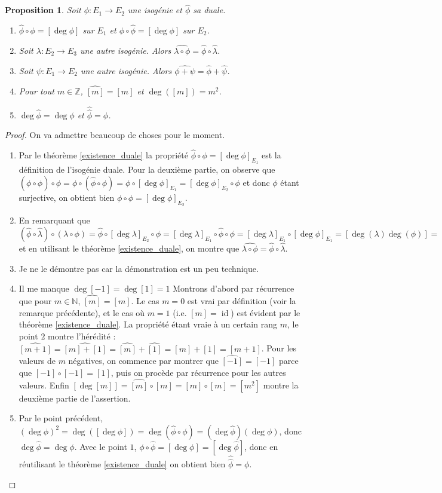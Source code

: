 \documentclass{article}
\theoremstyle{plain}%
\newtheorem{prop}[thm]{Proposition}
\theoremstyle{definition}%
\newcommand{\Z}{\mathbb{Z}}
\newcommand{\N}{\mathbb{N}}
\newcommand{\h}{\widehat}
\DeclareMathOperator{\id}{id}
\begin{document}
\begin{prop}
  Soit $\phi : E_1 \to E_2$ une isogénie et $\h\phi$ sa duale.  
  \begin{enumerate}
    \item $\h\phi\circ\phi = [\deg{\phi}]$ sur $E_1$ et $\phi\circ\h\phi = [\deg{\phi}]$ sur $E_2$.
    \item Soit $\lambda :E_2\to E_3$ une autre isogénie. Alors $\h{\lambda\circ\phi} = \h\phi\circ\h\lambda$.
    \item Soit $\psi :E_1\to E_2$ une autre isogénie. Alors $\h{\phi+\psi} = \h\phi + \h\psi$.
    \item Pour tout $m\in\Z$, $\h{[m]} = [m]$ et $\deg([m]) = m^2$.
    \item $\deg\h\phi = \deg\phi$ et $\h{\h\phi} = \phi$.
  \end{enumerate}
\end{prop}

\begin{proof}
  On va admettre beaucoup de choses pour le moment.
  \begin{enumerate}
    \item Par le théorème \ref{existence_duale} la propriété $\h\phi\circ\phi = [\deg{\phi}]_{E_1}$ est la définition de l'isogénie duale. Pour la deuxième partie, on observe que $(\phi\circ\h\phi)\circ\phi = \phi\circ(\h\phi\circ\phi) = \phi\circ[\deg{\phi}]_{E_1} = [\deg{\phi}]_{E_2}\circ\phi$ et donc $\phi$ étant surjective, on obtient bien $\phi\circ\h\phi = [\deg{\phi}]_{E_2}$.
    \item En remarquant que $(\h\phi\circ\h\lambda)\circ(\lambda\circ\phi) = \h\phi\circ [\deg\lambda]_{E_2} \circ\phi = [\deg\lambda]_{E_1}\circ\h\phi\circ\phi = [\deg\lambda]_{E_1}\circ [\deg\phi]_{E_1} = [\deg(\lambda)\deg(\phi)] = [\deg(\lambda\circ\phi)]$ et en utilisant le théorème \ref{existence_duale}, on montre que $\h{\lambda\circ\phi} = \h\phi\circ\h\lambda$.
    \item Je ne le démontre pas car la démonstration est un peu technique.
    \item {\color{blue} Il me manque $\deg[-1] = \deg[1] = 1$} Montrons d'abord par récurrence que pour $m\in\N$, $\h{[m]} = [m]$. Le cas $m=0$ est vrai par définition (voir la remarque précédente), et le cas où $m=1$ (i.e. $[m] = \id$) est évident par le théorème \ref{existence_duale}. La propriété étant vraie à un certain rang $m$, le point $2$ montre l'hérédité : $\h{[m+1]} = \h{[m] + [1]} = \h{[m]} + \h{[1]} = [m] + [1] = [m+1]$. Pour les valeurs de $m$ négatives, on commence par montrer que $\h{[-1]} = [-1]$ parce que $[-1] \circ [-1] = [1]$, puis on procède par récurrence pour les autres valeurs.
      Enfin $[\deg [m]] = \h{[m]} \circ [m] = [m] \circ [m] = [m^2]$ montre la deuxième partie de l'assertion.
    \item Par le point précédent, $ (\deg\phi)^2=\deg([\deg\phi])=\deg(\h\phi\circ\phi) = (\deg\h\phi)(\deg\phi)$, donc $\deg\h\phi = \deg\phi$. Avec le point $1$, $\phi\circ\h\phi = [\deg\phi] = [\deg \h\phi]$, donc en réutilisant le théorème \ref{existence_duale} on obtient bien $\h{\h\phi} = \phi$.
  \end{enumerate}
\end{proof}
\end{document}
